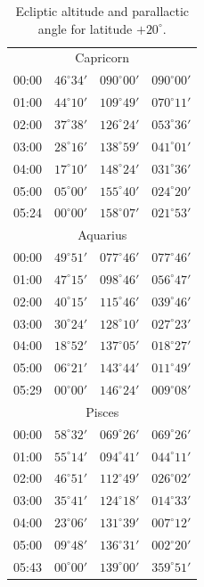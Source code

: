 \begin{table}[!h]
\begin{Parallel}{}{}
{{\begin{tabular}{l|lll}
\multicolumn{4}{c}{Capricorn}\\
00:00 & $46^\circ 34'$ & $090^\circ 00'$ & $090^\circ 00'$\\
01:00 & $44^\circ 10'$ & $109^\circ 49'$ & $070^\circ 11'$\\
02:00 & $37^\circ 38'$ & $126^\circ 24'$ & $053^\circ 36'$\\
03:00 & $28^\circ 16'$ & $138^\circ 59'$ & $041^\circ 01'$\\
04:00 & $17^\circ 10'$ & $148^\circ 24'$ & $031^\circ 36'$\\
05:00 & $05^\circ 00'$ & $155^\circ 40'$ & $024^\circ 20'$\\
05:24 & $00^\circ 00'$ & $158^\circ 07'$ & $021^\circ 53'$\\
\multicolumn{4}{c}{Aquarius}\\
00:00 & $49^\circ 51'$ & $077^\circ 46'$ & $077^\circ 46'$\\
01:00 & $47^\circ 15'$ & $098^\circ 46'$ & $056^\circ 47'$\\
02:00 & $40^\circ 15'$ & $115^\circ 46'$ & $039^\circ 46'$\\
03:00 & $30^\circ 24'$ & $128^\circ 10'$ & $027^\circ 23'$\\
04:00 & $18^\circ 52'$ & $137^\circ 05'$ & $018^\circ 27'$\\
05:00 & $06^\circ 21'$ & $143^\circ 44'$ & $011^\circ 49'$\\
05:29 & $00^\circ 00'$ & $146^\circ 24'$ & $009^\circ 08'$\\
\multicolumn{4}{c}{Pisces}\\
00:00 & $58^\circ 32'$ & $069^\circ 26'$ & $069^\circ 26'$\\
01:00 & $55^\circ 14'$ & $094^\circ 41'$ & $044^\circ 11'$\\
02:00 & $46^\circ 51'$ & $112^\circ 49'$ & $026^\circ 02'$\\
03:00 & $35^\circ 41'$ & $124^\circ 18'$ & $014^\circ 33'$\\
04:00 & $23^\circ 06'$ & $131^\circ 39'$ & $007^\circ 12'$\\
05:00 & $09^\circ 48'$ & $136^\circ 31'$ & $002^\circ 20'$\\
05:43 & $00^\circ 00'$ & $139^\circ 00'$ & $359^\circ 51'$\\
\end{tabular}
}}
\end{Parallel}
\caption{Ecliptic altitude and parallactic angle for latitude $+20^\circ$.}
\end{table}

